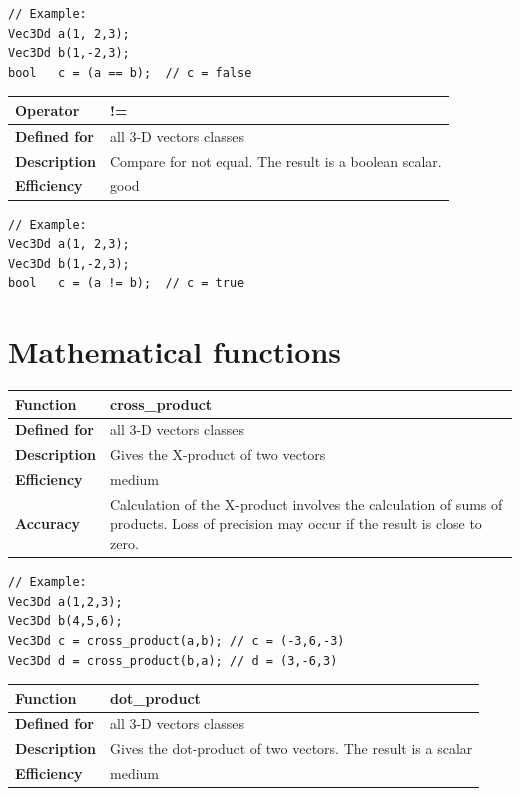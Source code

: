 \documentclass[11pt,a4paper,oneside,openright]{report}
\newcommand{\vspacesmall}{\vspace{3mm}}
\newcommand{\vspacebig}{\vspace{6mm}}
\begin{document}
\begin{lstlisting}[frame=none]
// Example:
Vec3Dd a(1, 2,3);
Vec3Dd b(1,-2,3);
bool   c = (a == b);  // c = false
\end{lstlisting}
\vspacebig


\begin{tabular}{|p{25mm}|p{100mm}|}
\hline
\bfseries Operator & != \\ \hline
\bfseries Defined for & all 3-D vectors classes  \\ \hline
\bfseries Description & Compare for not equal.\newline
The result is a boolean scalar. \\ \hline
\bfseries Efficiency & good \\ \hline
\end{tabular}
\vspacesmall

\begin{lstlisting}[frame=none]
// Example:
Vec3Dd a(1, 2,3);
Vec3Dd b(1,-2,3);
bool   c = (a != b);  // c = true
\end{lstlisting}
\vspacebig


\chapter{Mathematical functions}\label{chap:MathematicalFunctions}


\begin{tabular}{|p{25mm}|p{100mm}|}
\hline
\bfseries Function & cross\_product \\ \hline
\bfseries Defined for & all 3-D vectors classes  \\ \hline
\bfseries Description & Gives the X-product of two vectors \\ \hline
\bfseries Efficiency & medium \\ \hline
\bfseries Accuracy & Calculation of the X-product involves the calculation of sums of products. Loss of precision may occur if the result is close to zero. \\ \hline
\end{tabular}
\vspacesmall

\begin{lstlisting}[frame=none]
// Example:
Vec3Dd a(1,2,3);
Vec3Dd b(4,5,6);
Vec3Dd c = cross_product(a,b); // c = (-3,6,-3)
Vec3Dd d = cross_product(b,a); // d = (3,-6,3)
\end{lstlisting}
\vspacebig


\begin{tabular}{|p{25mm}|p{100mm}|}
\hline
\bfseries Function & dot\_product \\ \hline
\bfseries Defined for & all 3-D vectors classes  \\ \hline
\bfseries Description & Gives the dot-product of two vectors. The result is a scalar \\ \hline
\bfseries Efficiency & medium \\ \hline
\end{tabular}
\vspacesmall
\end{document}
